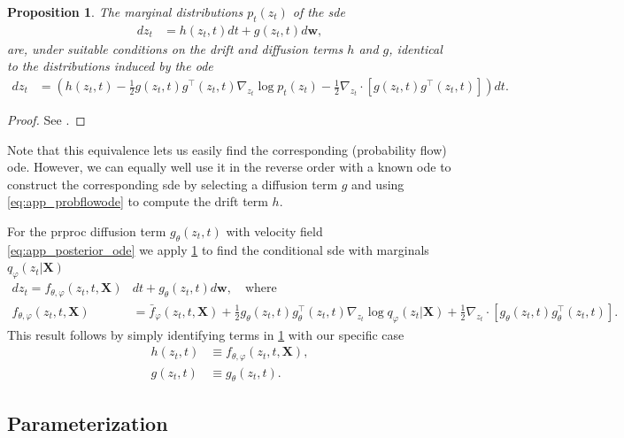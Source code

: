 \documentclass{article}
\def\X{\mathbf{X}}
\def\w{\mathbf{w}}
\def\ph{\varphi}
\def\th{\theta}
\def\barf{\bar{f}}
\def\n{\nabla}
\theoremstyle{plain}
\newtheorem{proposition}[theorem]{Proposition}
\theoremstyle{definition}
\theoremstyle{remark}
\begin{document}
\begin{proposition}
    The marginal distributions $p_t(z_t)$ of the \gls{sde}
    \begin{align}
         d z_t &= h(z_t, t) d t + g(z_t, t) d \w,
    \end{align}
    are, under suitable conditions on the drift and diffusion terms $h$ and $g$, identical to the distributions induced by the \gls{ode}
    \begin{align}
        d z_t &= \left(h(z_t, t) -\frac{1}{2} g(z_t, t) g^\top(z_t, t) \n_{z_t} \log p_t(z_t)  -\frac{1}{2} \n_{z_t} \cdot \left[g(z_t, t) g^\top(z_t, t)\right]\right) d t.
        \label{eq:app_probflowode}
    \end{align}
    \label{prop:odesde}
\end{proposition}
\begin{proof}
    See \citet[Appendix D.1]{song2021scorebased}.
\end{proof}
Note that this equivalence lets us easily find the corresponding (probability flow) \gls{ode}. However, we can equally well use it in the reverse order with a known \gls{ode} to construct the corresponding \gls{sde} by selecting a diffusion term $g$ and using \cref{eq:app_probflowode} to compute the drift term $h$.

For the \gls{prproc} diffusion term $g_\th(z_t,t)$ with velocity field \cref{eq:app_posterior_ode} we apply \cref{prop:odesde} to find the conditional \gls{sde} with marginals $q_\ph(z_t|\X)$
\begin{align}
    d z_t = f_{\th,\ph}(z_t, t, \X) &d t  + g_\th(z_t, t) d \w, \quad \textrm{where} 
    \label{eq:app_posterior_sde} \\
    f_{\th,\ph}(z_t, t, \X) &= 
    \label{eq:app_posterior_sde_drift}
         \barf_\ph(z_t, t, \X) + \frac{1}{2} g_\th(z_t, t) g^\top_\th(z_t, t) \n_{z_t} \log q_\ph(z_t|\X) + \frac{1}{2} \n_{z_t} \cdot \left[ g_\th(z_t, t) g^\top_\th(z_t, t) \right].
\end{align}
This result follows by simply identifying terms in \cref{prop:odesde} with our specific case
\begin{align*}
    h(z_t,t) &\equiv f_{\th,\ph}(z_t, t, \X), \\
    g(z_t,t) &\equiv g_\th(z_t,t).
\end{align*}

\subsection{Parameterization}
\label{app:parameterization}
\end{document}
